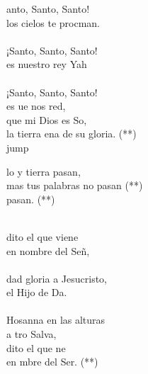 \begin{cancion}[Santo][Carismático]%
	anto, Santo, Santo! \\
	los cielos te procman.\\
	\jump\\
¡Santo, Santo, Santo! \\
	es nuestro rey Yah\\
	\jump\\
¡Santo, Santo, Santo! \\
	es ue nos red,\\
	que mi Dios es So, \\
	la tierra ena de su gloria. (**)\\jump\\
	\begin{chorus}%
	lo y tierra pasan, \\
	mas tus palabras no pasan (**)\\
	   pasan. (**)\\
	\end{chorus}%
	\jump\\
	dito el que viene \\
	en nombre del Señ, \\
	\jump\\
dad gloria a Jesucristo, \\
	el Hijo de Da.\\
	\jump\\
Hosanna en las alturas \\
	a tro Salva,\\
	dito el que ne \\
	en mbre del Ser. (**)\\
\end{cancion}%
